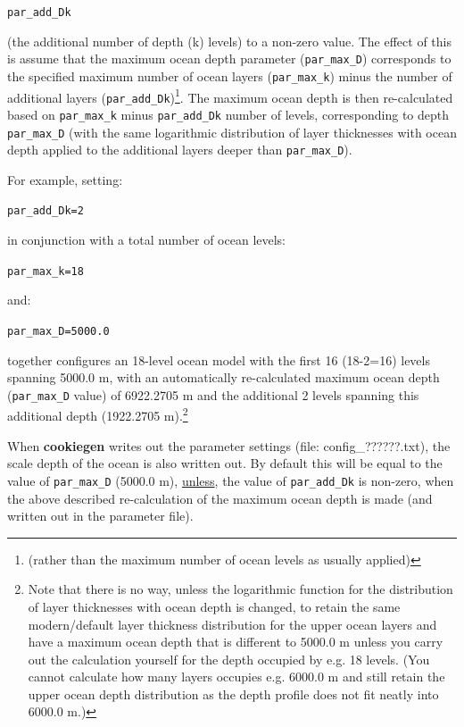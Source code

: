 \vspace{1mm}
\texttt{par\_add\_Dk}
\vspace{1mm}

\noindent (the additional number of depth (k) levels) to a non-zero value. The effect of this is assume that the maximum ocean depth parameter (\texttt{par\_max\_D}) corresponds to the specified maximum number of ocean layers (\texttt{par\_max\_k}) minus the number of additional layers (\texttt{par\_add\_Dk})\footnote{(rather than the maximum number of ocean levels as usually applied)}.  The maximum ocean depth is then re-calculated based on \texttt{par\_max\_k} minus \texttt{par\_add\_Dk} number of levels, corresponding to depth \texttt{par\_max\_D} (with the same logarithmic distribution of layer thicknesses with ocean depth applied to the additional layers deeper than \texttt{par\_max\_D}).

\noindent For example, setting:

\vspace{1mm}
\texttt{par\_add\_Dk=2}
\vspace{1mm}

\noindent in conjunction with a total number of ocean levels:

\vspace{1mm}
\texttt{par\_max\_k=18}
\vspace{1mm}

\noindent and:

\vspace{1mm}
\texttt{par\_max\_D=5000.0}
\vspace{1mm}

\noindent together configures an 18-level ocean model with the first 16 (18-2=16) levels spanning  5000.0 m, with an automatically re-calculated maximum ocean depth (\texttt{par\_max\_D} value) of 6922.2705 m and the additional 2 levels spanning this additional depth (1922.2705 m).\footnote{Note that there is no way, unless the logarithmic function for the distribution of layer thicknesses with ocean depth is changed, to retain the same modern/default  layer thickness distribution for the upper ocean layers and have a maximum ocean depth that is different to 5000.0 m unless you carry out the calculation yourself for the depth occupied by e.g. 18 levels. (You cannot calculate how many layers occupies e.g. 6000.0 m and still retain the upper ocean depth distribution as the depth profile does not fit neatly into 6000.0 m.)}

\vspace{1mm}
When \textbf{cookiegen} writes out the parameter settings (file: \textsf{\footnotesize config\_??????.txt}), the scale depth of the ocean is also written out. By default this will be equal to the value of \texttt{par\_max\_D} (5000.0 m), \uline{unless}, the value of \texttt{par\_add\_Dk} is non-zero, when the above described re-calculation of the maximum ocean depth is made (and written out in the parameter file).


